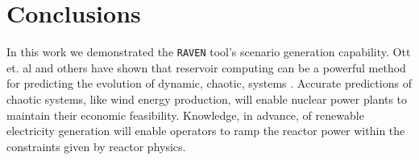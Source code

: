 \section{Conclusions}

In this work we demonstrated the \texttt{RAVEN} tool's scenario generation
capability. Ott et. al and others have shown that reservoir computing can be a
powerful method for predicting the evolution of dynamic, chaotic, systems
\cite{pathak_model-free_2018,wikner_combining_2020,bianchi_reservoir_2020}.
Accurate predictions of chaotic systems, like wind energy production, will
enable nuclear power plants to maintain their economic feasibility.
Knowledge, in advance, of renewable electricity generation will enable
operators to ramp the reactor power within the constraints given by reactor
physics. 
